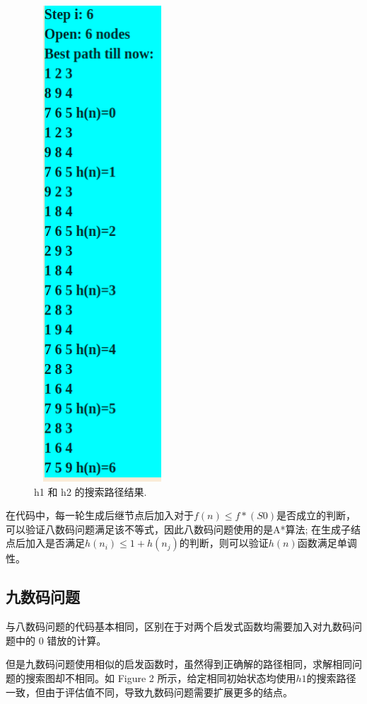 \begin{figure}
\includegraphics[width=2in, height=7in]{h2.png}
\caption{\label{fig:final}h1 和 h2 的搜索路径结果.}
\end{figure}

在代码中，每一轮生成后继节点后加入对于$f(n) \leq f*(S0)$是否成立的判断，可以验证八数码问题满足该不等式，因此八数码问题使用的是A*算法; 在生成子结点后加入是否满足$h(n_i) \leq 1 + h(n_j)$的判断，则可以验证$h(n)$函数满足单调性。

\subsection{九数码问题}
与八数码问题的代码基本相同，区别在于对两个启发式函数均需要加入对九数码问题中的 0 错放的计算。

但是九数码问题使用相似的启发函数时，虽然得到正确解的路径相同，求解相同问题的搜索图却不相同。如 Figure 2 所示，给定相同初始状态均使用$h1$的搜索路径一致，但由于评估值不同，导致九数码问题需要扩展更多的结点。

